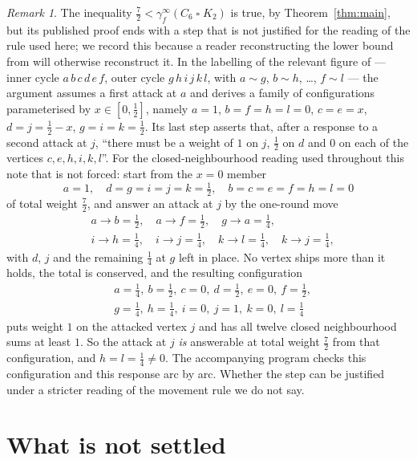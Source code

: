 \documentclass[11pt]{amsart}
\theoremstyle{remark}
\newtheorem*{remark}{Remark}
\newcommand{\fed}{\gamma_f^{\infty}}
\newcommand{\half}{\tfrac12}
\begin{document}
\begin{remark}
The inequality $\tfrac72<\fed(C_6\mathbin{\square}K_2)$ is true, by
Theorem~\ref{thm:main}, but its published proof ends with a step that is not
justified for the reading of the rule used here; we record this because a reader
reconstructing the lower bound from \cite{FED}
will otherwise reconstruct it. In the labelling of the relevant figure of
\cite{FED} --- inner cycle $a\,b\,c\,d\,e\,f$, outer cycle
$g\,h\,i\,j\,k\,l$, with $a\sim g$, $b\sim h$, \ldots, $f\sim l$ --- the
argument assumes a first attack at $a$ and derives a family of configurations
parameterised by $x\in[0,\half]$, namely $a=1$, $b=f=h=l=0$, $c=e=x$,
$d=j=\half-x$, $g=i=k=\half$. Its last step asserts that, after a response to a
second attack at $j$, ``there must be a weight of $1$ on $j$, $\half$ on $d$
and $0$ on each of the vertices $c,e,h,i,k,l$''. For the closed-neighbourhood
reading used throughout this note that is not forced: start from the $x=0$
member
\[
 a=1,\quad d=g=i=j=k=\tfrac12,\quad b=c=e=f=h=l=0
\]
of total weight $\tfrac72$, and answer an attack at $j$ by the one-round move
\[
\begin{aligned}
 &a\to b=\tfrac12,\quad a\to f=\tfrac12,\quad g\to a=\tfrac14,\\
 &i\to h=\tfrac14,\quad i\to j=\tfrac14,\quad
  k\to l=\tfrac14,\quad k\to j=\tfrac14,
\end{aligned}
\]
with $d$, $j$ and the remaining $\tfrac14$ at $g$ left in place. No vertex
ships more than it holds, the total is conserved, and the resulting
configuration
\[
\begin{aligned}
 &a=\tfrac14,\ b=\tfrac12,\ c=0,\ d=\tfrac12,\ e=0,\ f=\tfrac12,\\
 &g=\tfrac14,\ h=\tfrac14,\ i=0,\ j=1,\ k=0,\ l=\tfrac14
\end{aligned}
\]
puts weight $1$ on the attacked vertex $j$ and has all twelve closed
neighbourhood sums at least $1$. So the attack at $j$ \emph{is} answerable at
total weight $\tfrac72$ from that configuration, and $h=l=\tfrac14\ne0$. The
accompanying program checks this configuration and this response arc by arc.
Whether the step can be justified under a stricter reading of the movement rule
we do not say.
\end{remark}

\section{What is not settled}\label{sec:open}
\end{document}
